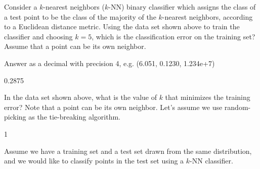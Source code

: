 \documentclass[11pt,addpoints,answers]{exam}
\numberwithin{equation}{section} %
\numberwithin{figure}{section} %
\numberwithin{table}{section} %
\begin{document}
\begin{questions}
    \question[3] Consider a $k$-nearest neighbors ($k$-NN) binary classifier which assigns the class of a test point to be the class of the majority of the $k$-nearest neighbors, according to a Euclidean distance metric. Using the data set shown above to train the classifier and choosing $k=5$, which is the classification error on the training set? Assume that a point can be its own neighbor.
    
    Answer as a decimal with precision 4, e.g. (6.051, 0.1230, 1.234e+7)
    
    \begin{tcolorbox}[fit,height=1cm, width=4cm, blank, borderline={1pt}{-2pt},nobeforeafter, top=2pt, left=2pt, right=2pt, bottom=2pt]
	    0.2875
    \end{tcolorbox}
 
    
    
    \question[3] In the data set shown above, what is the value of $k$ that minimizes the training error? Note that a point can be its own neighbor. Let’s assume we use random-picking as the tie-breaking algorithm.
    
    \begin{tcolorbox}[fit,height=1cm, width=4cm, blank, borderline={1pt}{-2pt},nobeforeafter, top=2pt, left=2pt, right=2pt, bottom=2pt]
	    1
    \end{tcolorbox}

    
    
    \question[3] Assume we have a training set and a test set drawn from the same distribution, and we would like to classify points in the test set using a $k$-NN classifier. 
    
\end{questions}
\end{document}
